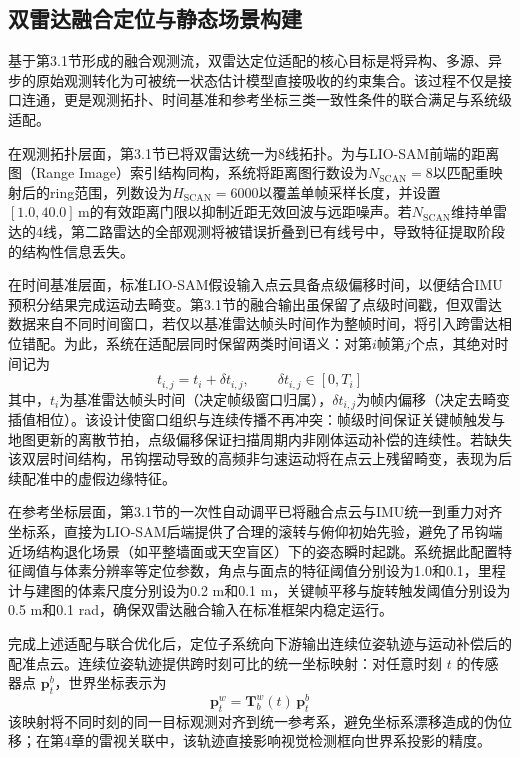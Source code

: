 \subsection{双雷达融合定位与静态场景构建}\label{sec:ch3_lio_input_interface}

基于第3.1节形成的融合观测流，双雷达定位适配的核心目标是将异构、多源、异步的原始观测转化为可被统一状态估计模型直接吸收的约束集合。该过程不仅是接口连通，更是观测拓扑、时间基准和参考坐标三类一致性条件的联合满足与系统级适配。

在观测拓扑层面，第3.1节已将双雷达统一为8线拓扑。为与LIO-SAM前端的距离图（Range Image）索引结构同构，系统将距离图行数设为$N_{\mathrm{SCAN}}=8$以匹配重映射后的ring范围，列数设为$H_{\mathrm{SCAN}}=6000$以覆盖单帧采样长度，并设置$[1.0,40.0]\,\mathrm{m}$的有效距离门限以抑制近距无效回波与远距噪声。若$N_{\mathrm{SCAN}}$维持单雷达的4线，第二路雷达的全部观测将被错误折叠到已有线号中，导致特征提取阶段的结构性信息丢失。

在时间基准层面，标准LIO-SAM假设输入点云具备点级偏移时间，以便结合IMU预积分结果完成运动去畸变。第3.1节的融合输出虽保留了点级时间戳，但双雷达数据来自不同时间窗口，若仅以基准雷达帧头时间作为整帧时间，将引入跨雷达相位错配。为此，系统在适配层同时保留两类时间语义：对第$i$帧第$j$个点，其绝对时间记为
\begin{equation}
t_{i,j}=t_i+\delta t_{i,j},\qquad \delta t_{i,j}\in[0,T_i]
\end{equation}
其中，$t_i$为基准雷达帧头时间（决定帧级窗口归属），$\delta t_{i,j}$为帧内偏移（决定去畸变插值相位）。该设计使窗口组织与连续传播不再冲突：帧级时间保证关键帧触发与地图更新的离散节拍，点级偏移保证扫描周期内非刚体运动补偿的连续性。若缺失该双层时间结构，吊钩摆动导致的高频非匀速运动将在点云上残留畸变，表现为后续配准中的虚假边缘特征。

在参考坐标层面，第3.1节的一次性自动调平已将融合点云与IMU统一到重力对齐坐标系，直接为LIO-SAM后端提供了合理的滚转与俯仰初始先验，避免了吊钩端近场结构退化场景（如平整墙面或天空盲区）下的姿态瞬时起跳。系统据此配置特征阈值与体素分辨率等定位参数，角点与面点的特征阈值分别设为1.0和0.1，里程计与建图的体素尺度分别设为0.2 m和0.1 m，关键帧平移与旋转触发阈值分别设为0.5 m和0.1 rad，确保双雷达融合输入在标准框架内稳定运行。

完成上述适配与联合优化后，定位子系统向下游输出连续位姿轨迹与运动补偿后的配准点云。连续位姿轨迹提供跨时刻可比的统一坐标映射：对任意时刻 $t$ 的传感器点 $\mathbf{p}^{b}_{t}$，世界坐标表示为
\begin{equation}
\mathbf{p}^{w}_{t}=\mathbf{T}^{w}_{b}(t)\,\mathbf{p}^{b}_{t}
\end{equation}
该映射将不同时刻的同一目标观测对齐到统一参考系，避免坐标系漂移造成的伪位移；在第4章的雷视关联中，该轨迹直接影响视觉检测框向世界系投影的精度。

